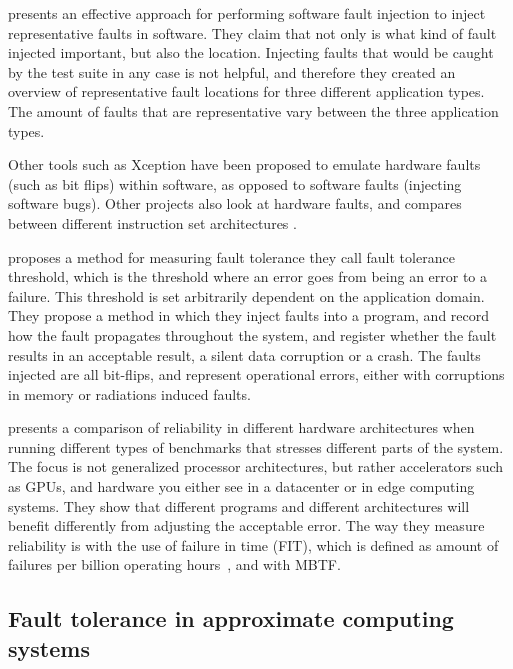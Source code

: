 \citet{natella2012fault} presents an effective approach for performing software fault injection to inject representative faults in software. They claim that not only is what kind of fault injected important, but also the location. Injecting faults that would be caught by the test suite in any case is not helpful, and therefore they created an overview of representative fault locations for three different application types. The amount of faults that are representative vary between the three application types. 

Other tools such as Xception \citep{carreira1998xception} have been proposed to emulate hardware faults (such as bit flips) within software, as opposed to software faults (injecting software bugs). Other projects also look at hardware faults, and compares between different instruction set architectures \citep{venkatagiri2019gem5, fratin2018code}.

\citet{li2021understanding} proposes a method for measuring fault tolerance they call fault tolerance threshold, which is the threshold where an error goes from being an error to a failure. This threshold is set arbitrarily dependent on the application domain. They propose a method in which they inject faults into a program, and record how the fault propagates throughout the system, and register whether the fault results in an acceptable result, a silent data corruption or a crash. The faults injected are all bit-flips, and represent operational errors, either with corruptions in memory or radiations induced faults. 

\citet{fratin2018code} presents a comparison of reliability in different hardware architectures when running different types of benchmarks that stresses different parts of the system. The focus is not generalized processor architectures, but rather accelerators such as GPUs, and hardware you either see in a datacenter or in edge computing systems. They show that different programs and different architectures will benefit differently from adjusting the acceptable error. The way they measure reliability is with the use of failure in time (FIT), which is defined as amount of failures per billion operating hours~\citep{ReliabilityTexasInstruments}, and with MBTF.



\subsection{Fault tolerance in approximate computing systems}

